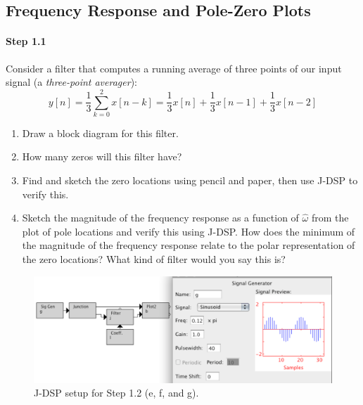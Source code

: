 \subsection{Frequency Response and Pole-Zero Plots}

\paragraph{Step 1.1} Consider a filter that computes a running average
of three points of our input signal (a \emph{three-point averager}):
\begin{equation}
y[n] = \frac{1}{3} \sum_{k=0}^2 x[n-k] 
     = \frac{1}{3}x[n] + \frac{1}{3}x[n-1] + \frac{1}{3}x[n-2]
\end{equation}

\begin{enumerate}\renewcommand{\theenumi}{\alph{enumi}}
\item Draw a block diagram for this filter.


\item How many zeros will this filter have?


\item Find and sketch the zero locations using pencil and paper, then
  use J-DSP to verify this.

\item Sketch the magnitude of the frequency response as a function of
	$\hat{\omega}$ from the plot of pole locations and verify this using
	J-DSP. How does the minimum of the magnitude of the frequency
	response relate to the polar representation of the zero locations?
	What kind of filter would you say this is?

\end{enumerate}

\begin{figure}
  \begin{center}
    \includegraphics[width=6in]{lab4/filteredsignal}
  \end{center}
\caption{J-DSP setup for Step 1.2 (e, f, and g). \label{fg:filtsig}}
\end{figure}

